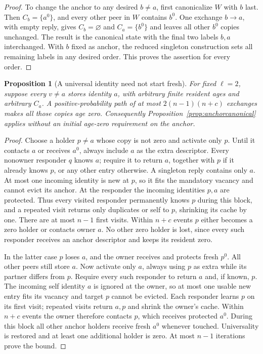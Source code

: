 \documentclass[11pt]{article}
\newtheorem{proposition}[theorem]{Proposition}
\begin{document}
\begin{proof}
To change the anchor to any desired $b\ne a$, first
canonicalize $W$ with $b$ last. Then $C_b=\{a^0\}$,
and every other peer in $W$ contains $b^0$.
One exchange $b\to a$, with empty reply, gives
$C_b=\varnothing$ and $C_a=\{b^0\}$ and leaves all
other $b^0$ copies unchanged. The result is the canonical
state with the final two labels $b,a$ interchanged.
With $b$ fixed as anchor, the reduced singleton
construction sets all remaining labels in any desired
order. This proves the assertion for every order.
\end{proof}

\begin{proposition}[A universal identity need not start fresh]
\label{prop:anyanchor}
For fixed $\ell=2$, suppose every $v\ne a$ stores identity
$a$, with arbitrary finite resident ages and arbitrary
$C_a$. A positive-probability path of at most
$2(n-1)(n+c)$ exchanges makes all those copies age zero.
Consequently Proposition~\ref{prop:anchorcanonical} applies
without an initial age-zero requirement on the anchor.
\end{proposition}
\begin{proof}
Choose a holder $p\ne a$ whose copy is not zero and
activate only $p$. Until it contacts $a$ or receives $a^0$,
always include $a$ as the extra descriptor. Every nonowner
responder $q$ knows $a$; require it to return $a$, together
with $p$ if it already knows $p$, or any other entry
otherwise. A singleton reply contains only $a$.
At most one incoming identity is new at $p$, so it fits
the mandatory vacancy and cannot evict its anchor.
At the responder the incoming identities $p,a$ are
protected. Thus every visited responder permanently knows
$p$ during this block, and a repeated visit returns only
duplicates or self to $p$, shrinking its cache by one.
There are at most $n-1$ first visits. Within $n+c$ events
$p$ either becomes a zero holder or contacts owner $a$.
No other zero holder is lost, since every such responder
receives an anchor descriptor and keeps its resident zero.

In the latter case $p$ loses $a$, and the owner receives
and protects fresh $p^0$. All other peers still store $a$.
Now activate only $a$, always using $p$ as extra while its
partner differs from $p$. Require every such responder to
return $a$ and, if known, $p$. The incoming self identity
$a$ is ignored at the owner, so at most one usable new
entry fits its vacancy and target $p$ cannot be evicted.
Each responder learns $p$ on its first visit; repeated
visits return $a,p$ and shrink the owner's cache.
Within $n+c$ events the owner therefore contacts $p$,
which receives protected $a^0$. During this block all other
anchor holders receive fresh $a^0$ whenever touched.
Universality is restored and at least one additional
holder is zero. At most $n-1$ iterations prove the bound.
\end{proof}
\end{document}
